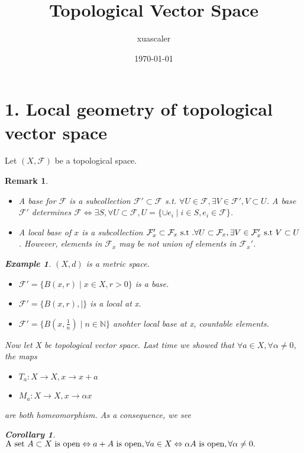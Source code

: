 \documentclass{article}
\title{Topological Vector Space}
\author{xuascaler}
\date{\today}
\newtheorem*{remark}{Remark}
\newtheorem*{example}{Example}
\newtheorem*{corollary}{Corollary}
\begin{document}
\maketitle

\section*{1. Local geometry of topological vector space}
Let $(X, \mathcal{F})$ be a topological space.
\begin{remark} \hfill
  \begin{itemize}
    \item A base for $\mathcal{F}$ is a subcollection 
    $\mathcal{F}' \subset \mathcal{F}$ s.t. 
    $\forall U \in \mathcal{F}, \exists V \in \mathcal{F}', V \subset U$.
    A base 
    $
      \mathcal{F}'$ determines $\mathcal{F} \Leftrightarrow
      \exists S, \forall U \subset \mathcal{F},
      U = \{\cup e_i \mid i \in S, e_i \in \mathcal{F}\}
    $.
    \item  A local base of $x$ is a subcollection 
    $\mathcal{F}_x' \subset \mathcal{F}_x
    \textnormal{ s.t }. \forall U \subset \mathcal{F}_x, \exists V \in \mathcal{F}_x' \textnormal{ s.t } V \subset U$.
    However, elements in $\mathcal{F}_x$ may be not union of elements in $\mathcal{F}_x'$.
  \end{itemize}
  \begin{example}
    $(X, d)$ is a metric space.
    \begin{itemize}
      \item $\mathcal{F}' = \{B(x, r) \mid x \in X, r > 0\}$ is a base.
      \item $\mathcal{F}' = \{B(x, r), \mid\}$ is a local at x.
      \item $\mathcal{F}' = \{B(x, \frac{1}{n}) \mid n \in \mathbb{N}\}$
      anohter local base at x, countable elements.
    \end{itemize}
  \end{example}
  Now let X be topological vector space. Last time we showed that 
  $\forall a \in X, \forall \alpha \neq 0$, the maps
  \begin{itemize}
    \item $T_a: X \rightarrow X, x \rightarrow x + a$
    \item $M_a: X \rightarrow X, x \rightarrow \alpha x$
  \end{itemize}
  are both homeomorphism. As a consequence, we see
  \begin{corollary}
    $
    \textnormal{A set }  A \subset X \textnormal{ is open} \Leftrightarrow
    a + A \textnormal{ is open}, \forall a \in X \Leftrightarrow
    \alpha A \textnormal{ is open}, \forall \alpha \neq 0.
    $ 
  \end{corollary}
\end{remark} 
\end{document}
